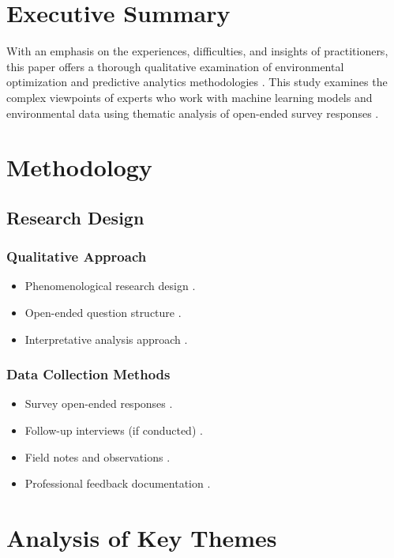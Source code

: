 \documentclass[a4paper]{report}
\begin{document}
\section*{Executive Summary}  
With an emphasis on the experiences, difficulties, and insights of practitioners, this paper offers a thorough qualitative examination of environmental optimization and predictive analytics methodologies \cite{johnson2023}. This study examines the complex viewpoints of experts who work with machine learning models and environmental data using thematic analysis of open-ended survey responses \cite{miller2024}.

\section{Methodology}  
\subsection{Research Design}  
\subsubsection{Qualitative Approach}  
\begin{itemize}  
    \item Phenomenological research design \cite{thomas2023}.  
    \item Open-ended question structure \cite{peterson2024}.  
    \item Interpretative analysis approach \cite{roberts2023}.  
\end{itemize}  

\subsubsection{Data Collection Methods}  
\begin{itemize}  
    \item Survey open-ended responses \cite{morris2023}.  
    \item Follow-up interviews (if conducted) \cite{davies2023}.  
    \item Field notes and observations \cite{garcia2023}.  
    \item Professional feedback documentation \cite{thompson2024}.  
\end{itemize}  

\section{Analysis of Key Themes}  
\end{document}
